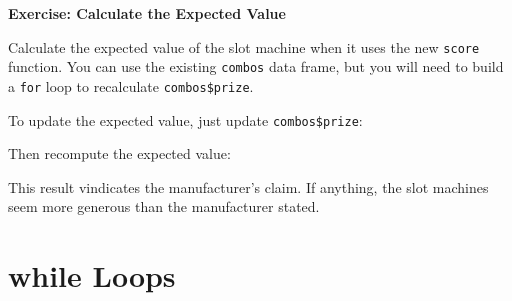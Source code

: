 \documentclass[
  letterpaper,
  DIV=11,
  numbers=noendperiod]{scrbook}
\newenvironment{Shaded}{\begin{snugshade}}{\end{snugshade}}
\newcommand{\ControlFlowTok}[1]{\textcolor[rgb]{0.00,0.23,0.31}{\textbf{#1}}}
\newcommand{\DecValTok}[1]{\textcolor[rgb]{0.68,0.00,0.00}{#1}}
\newcommand{\DocumentationTok}[1]{\textcolor[rgb]{0.37,0.37,0.37}{\textit{#1}}}
\newcommand{\FunctionTok}[1]{\textcolor[rgb]{0.28,0.35,0.67}{#1}}
\newcommand{\NormalTok}[1]{\textcolor[rgb]{0.00,0.23,0.31}{#1}}
\newcommand{\OtherTok}[1]{\textcolor[rgb]{0.00,0.23,0.31}{#1}}
\newcommand{\SpecialCharTok}[1]{\textcolor[rgb]{0.37,0.37,0.37}{#1}}
\begin{document}
\begin{tcolorbox}[enhanced jigsaw, left=2mm, breakable, colback=white, colframe=quarto-callout-color-frame, leftrule=.75mm, bottomrule=.15mm, arc=.35mm, opacityback=0, rightrule=.15mm, toprule=.15mm]

\vspace{-3mm}\textbf{Exercise: Calculate the Expected Value}\vspace{3mm}

Calculate the expected value of the slot machine when it uses the new
\texttt{score} function. You can use the existing \texttt{combos} data
frame, but you will need to build a \texttt{for} loop to recalculate
\texttt{combos\$prize}.

\end{tcolorbox}

To update the expected value, just update \texttt{combos\$prize}:

\begin{Shaded}
\end{Shaded}

Then recompute the expected value:

\begin{Shaded}
\end{Shaded}

This result vindicates the manufacturer's claim. If anything, the slot
machines seem more generous than the manufacturer stated.

\section{while Loops}\label{while-loops}
\end{document}
